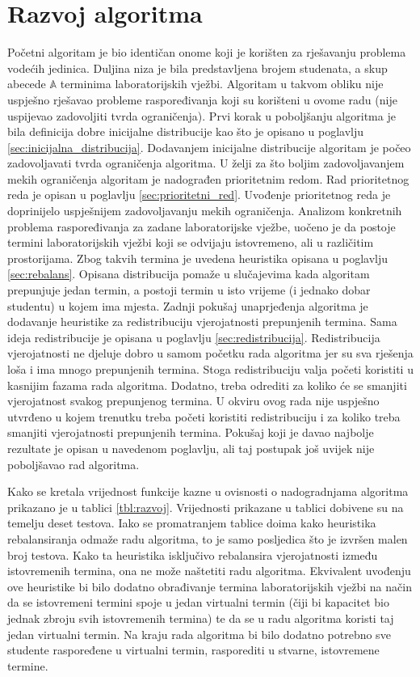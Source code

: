 \documentclass[times, utf8, zavrsni]{fer}
\begin{document}
\section{Razvoj algoritma}
Početni algoritam je bio identičan onome koji je korišten za rješavanju problema vodećih jedinica. Duljina niza je bila predstavljena brojem studenata, a skup abecede
$\mathbb{A}$ terminima laboratorijskih vježbi. Algoritam u takvom obliku nije uspješno rješavao probleme raspoređivanja koji su korišteni u ovome radu (nije
uspijevao zadovoljiti tvrda ograničenja). Prvi korak u poboljšanju algoritma je bila definicija dobre inicijalne distribucije kao što je opisano u poglavlju
\ref{sec:inicijalna_distribucija}. Dodavanjem inicijalne distribucije algoritam je počeo zadovoljavati tvrda ograničenja algoritma. U želji za što boljim zadovoljavanjem
mekih ograničenja algoritam je nadograđen prioritetnim redom. Rad prioritetnog reda je opisan u poglavlju \ref{sec:prioritetni_red}. Uvođenje prioritetnog reda je doprinijelo
uspješnijem zadovoljavanju mekih ograničenja. Analizom konkretnih problema raspoređivanja za zadane laboratorijske vježbe, uočeno je da postoje termini laboratorijskih vježbi
koji se odvijaju istovremeno, ali u različitim prostorijama. Zbog takvih termina je uvedena heuristika opisana u poglavlju \ref{sec:rebalans}. Opisana distribucija pomaže
u slučajevima kada algoritam prepunjuje jedan termin, a postoji termin u isto vrijeme (i jednako dobar studentu) u kojem ima mjesta. Zadnji pokušaj unaprjeđenja algoritma
je dodavanje heuristike za redistribuciju vjerojatnosti prepunjenih termina. Sama ideja redistribucije je opisana u poglavlju \ref{sec:redistribucija}. Redistribucija vjerojatnosti
ne djeluje dobro u samom početku rada algoritma jer su sva rješenja loša i ima mnogo prepunjenih termina. Stoga redistribuciju valja početi koristiti u kasnijim fazama
rada algoritma. Dodatno, treba odrediti za koliko će se smanjiti vjerojatnost svakog prepunjenog termina. U okviru ovog rada nije uspješno utvrđeno u kojem trenutku treba
početi koristiti redistribuciju i za koliko treba smanjiti vjerojatnosti prepunjenih termina. Pokušaj koji je davao najbolje rezultate je opisan u navedenom poglavlju, ali
taj postupak još uvijek nije poboljšavao rad algoritma.

Kako se kretala vrijednost funkcije kazne u ovisnosti o nadogradnjama algoritma prikazano je u tablici \ref{tbl:razvoj}. Vrijednosti prikazane u tablici dobivene su na temelju
deset testova. Iako se promatranjem tablice doima kako heuristika rebalansiranja odmaže radu algoritma, to je samo posljedica što je izvršen malen broj testova. Kako
ta heuristika isključivo rebalansira vjerojatnosti između istovremenih termina, ona ne može naštetiti radu algoritma. Ekvivalent uvođenju ove heuristike bi bilo dodatno
obrađivanje termina laboratorijskih vježbi na način da se istovremeni termini spoje u jedan virtualni termin (čiji bi kapacitet bio jednak zbroju svih istovremenih termina)
te da se u radu algoritma koristi taj jedan virtualni termin. Na kraju rada algoritma bi bilo dodatno potrebno sve studente raspoređene u virtualni termin, rasporediti u
stvarne, istovremene termine.
\end{document}
